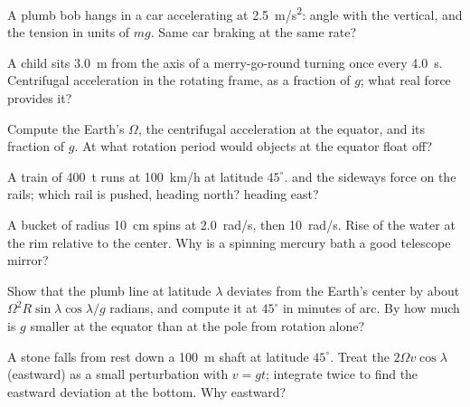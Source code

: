 \begin{exercise}[$\star$]\label{exo:b1:non-inertial-frames:1}
A plumb bob hangs in a car accelerating at \qty{2.5}{m/s^2}: angle with
the vertical, and the tension in units of $mg$. Same car braking at the
same rate?
\end{exercise}

\begin{exercise}[$\star$]\label{exo:b1:non-inertial-frames:2}
A child sits \qty{3.0}{m} from the axis of a merry-go-round turning once
every \qty{4.0}{s}. Centrifugal acceleration in the rotating frame, as a
fraction of $g$; what real force provides it?
\end{exercise}

\begin{exercise}[$\star$]\label{exo:b1:non-inertial-frames:3}
Compute the Earth's  $\Omega$, the centrifugal acceleration
at the equator, and its fraction of $g$. At what rotation period would
objects at the equator float off?
\end{exercise}

\begin{exercise}[$\star$]\label{exo:b1:non-inertial-frames:4}
A train of \qty{400}{t} runs at \qty{100}{km/h} at latitude $45^\circ$.
 and the sideways force on the rails; which rail
is pushed, heading north? heading east?
\end{exercise}

\begin{exercise}[$\star\star$]\label{exo:b1:non-inertial-frames:5}
A bucket of radius \qty{10}{cm} spins at \qty{2.0}{rad/s}, then
\qty{10}{rad/s}. Rise of the water at the rim relative to the center.
Why is a spinning mercury bath a good telescope mirror?
\end{exercise}

\begin{exercise}[$\star\star$]\label{exo:b1:non-inertial-frames:6}
Show that the plumb line at latitude $\lambda$ deviates from the Earth's
center by about $\Omega^2R\sin\lambda\cos\lambda/g$ radians, and compute it
at $45^\circ$ in minutes of arc. By how much is $g$ smaller at the equator
than at the pole from rotation alone?
\end{exercise}

\begin{exercise}[$\star\star$]\label{exo:b1:non-inertial-frames:7}
A stone falls from rest down a \qty{100}{m} shaft at latitude $45^\circ$.
Treat the  $2\Omega v\cos\lambda$ (eastward) as a small
perturbation with $v = gt$; integrate twice to find the eastward
deviation at the bottom. Why eastward?
\end{exercise}

